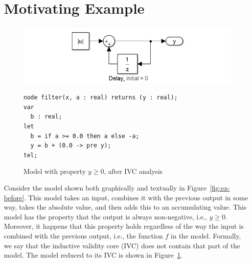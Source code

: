 \section{Motivating Example}
\label{sec:exmpl}

\begin{figure}[t]
\includegraphics[width=\columnwidth]{figs/simulink-ivc.png}
{\smaller
\begin{verbatim}
node filter(x, a : real) returns (y : real);
var
  b : real;
let
  b = if a >= 0.0 then a else -a;
  y = b + (0.0 -> pre y);
tel;
\end{verbatim}
}
\caption{Model with property $y \geq 0$, after IVC analysis}
\label{fig:ex-after}
\end{figure}

Consider the model shown both graphically and textually in
Figure~\ref{fig:ex-before}. This model takes an input, combines it
with the previous output in some way, takes the absolute value, and
then adds this to an accumulating value. This model has the property
that the output is always non-negative, i.e., $y \geq 0$. Moreover, it
happens that this property holds regardless of the way the input is
combined with the previous output, i.e., the function $f$ in the
model. Formally, we say that the inductive validity core (IVC) does
not contain that part of the model. The model reduced to its IVC is
shown in Figure~\ref{fig:ex-after}.

